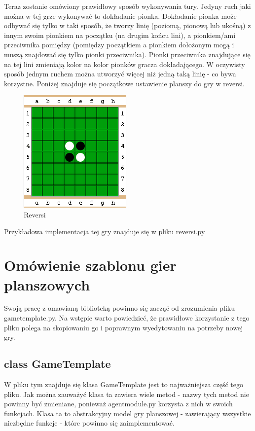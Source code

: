 \documentclass[polish,shortabstract,inz]{iithesis}
\begin{document}
Teraz zostanie omówiony prawidłowy sposób wykonywania tury.
Jedyny ruch jaki można w tej grze wykonywać to dokładanie pionka.
Dokładanie pionka może odbywać się tylko w taki sposób, że tworzy linię (poziomą, pionową lub ukośną) z innym swoim pionkiem na początku (na drugim końcu lini), a pionkiem/ami przeciwnika pomiędzy (pomiędzy początkiem a pionkiem dołożonym mogą i muszą znajdować się tylko pionki przeciwnika).
Pionki przeciwnika znajdujące się na tej lini zmieniają kolor na kolor pionków gracza dokładającego.
W oczywisty sposób jednym ruchem można utworzyć więcej niż jedną taką linię - co bywa korzystne.
Poniżej znajduje się początkowe ustawienie planszy do gry w reversi.
\begin{figure}[H]
  \includegraphics{./images/reversi.png}
  \centering
  \caption{Reversi}
  \label{fig:reversi}
\end{figure}

Przykładowa implementacja tej gry znajduje się w pliku reversi.py


\section{Omówienie szablonu gier planszowych}
Swoją pracę z omawianą biblioteką powinno się zacząć od zrozumienia pliku game\textunderscore template.py.
Na wstępie warto powiedzieć, że prawidłowe korzystanie z tego pliku polega na skopiowaniu go i poprawnym wyedytowaniu na potrzeby nowej gry.

\subsection{class GameTemplate}
W pliku tym znajduje się klasa GameTemplate jest to najważniejsza część tego pliku.
Jak można zauważyć klasa ta zawiera wiele metod - nazwy tych metod nie powinny być zmieniane, ponieważ agent\textunderscore module.py korzysta z nich w swoich funkcjach.
Klasa ta to abstrakcyjny model gry planszowej - zawierający wszystkie niezbędne funkcje - które powinno się zaimplementować.
\end{document}
